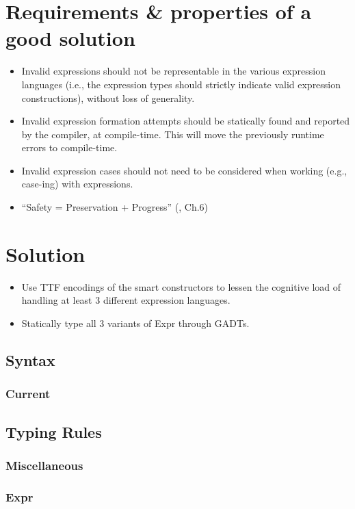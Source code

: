 \section{Requirements \& properties of a good solution}

\begin{itemize}

      \item Invalid expressions should not be representable in the various
            expression languages (i.e., the expression types should strictly
            indicate valid expression constructions), without loss of
            generality.

      \item Invalid expression formation attempts should be statically found and
            reported by the compiler, at compile-time. This will move the
            previously runtime errors to compile-time.

      \item Invalid expression cases should not need to be considered when
            working (e.g., case-ing) with expressions.

      \item ``Safety = Preservation + Progress'' (\cite{Harper2016}, Ch.6)

\end{itemize}

\section{Solution}

\begin{itemize}

      \item Use TTF encodings of the smart constructors to lessen the cognitive
            load of handling at least 3 different expression languages.

      \item Statically type all 3 variants of Expr through GADTs.

\end{itemize}

\subsection{Syntax}

\subsubsection{Current}



\subsection{Typing Rules}

\subsubsection{Miscellaneous}



\subsubsection{Expr}


